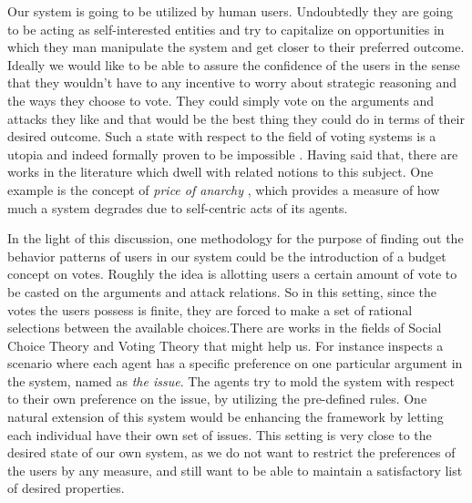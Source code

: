 \documentclass{article}
\begin{document}
Our system is going to be utilized by human users. Undoubtedly they are going to be acting as self-interested entities and try to capitalize on opportunities in which they man manipulate the system and get closer to their preferred outcome. Ideally we would like to be able to assure the confidence of the users in the sense that they wouldn't have to any incentive to worry about strategic reasoning and the ways they choose to vote. They could simply vote on the arguments and attacks they like and that would be the best thing they could do in terms of their desired outcome. Such a state with respect to the field of voting systems is a utopia and indeed formally proven to be impossible \cite{arrow}. Having said that, there are works in the literature which dwell with related notions to this subject. One example is the concept of \textit{price of anarchy}  \cite{koutsoupiasP99}, which provides a measure of how much a system degrades due to self-centric acts of its agents.

In the light of this discussion, one methodology for the purpose of finding out the behavior patterns of users in our system could be the introduction of a budget concept on votes. Roughly the idea is allotting users a certain amount of vote to be casted on the arguments and attack relations. So in this setting, since the votes the users possess is finite, they are forced to make a set of rational selections between the available choices.There are works in the fields of Social Choice Theory and Voting Theory that might help us. For instance \cite{bonzonmaudet11} inspects a scenario where each agent has a specific preference on one particular argument in the system, named as \textit{the issue}. The agents try to mold the system with respect to their own preference on the issue, by utilizing the pre-defined rules. One natural extension of this system would be enhancing the framework by letting each individual have their own set of issues. This setting is very close to the desired state of our own system, as we do not want to restrict the preferences of the users by any measure, and still want to be able to maintain a satisfactory list of desired properties.  
\end{document}
